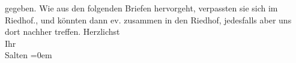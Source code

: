 \begin{ledgroupsized}[t]{13cm}
{{{                  gegeben. Wie aus den folgenden Briefen hervorgeht, verpassten sie sich im Riedhof.}}}\label{K_L03402-2h}, und könnten dann ev. zusammen
               in den Riedhof, jedesfalls aber uns dort nachher
               treffen.\pend
           \pstart
           Herzlichst {\\[\baselineskip]}Ihr {\\[\baselineskip]}\spacefill\mbox{Salten}\pend
           \leftskip=0em{}
         
         \endnumbering{}\end{ledgroupsized}  \newcommand{\dateiname}{L03402}\newcommand{\titel}{Felix Salten an Arthur Schnitzler, [20. 12. 1904]}\newcommand{\editorInnen}{Martin Anton Müller und Laura Untner}
      